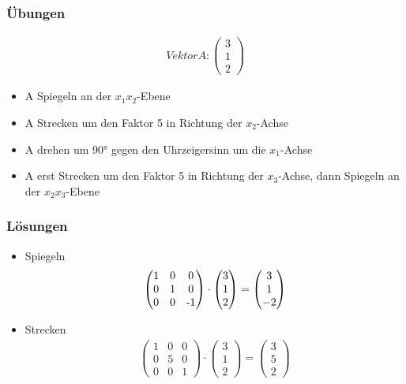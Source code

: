 \begin{frame}
	\frametitle{Übungen}
	\begin{gather*}
	Vektor A: \begin{pmatrix}
		3 \\
		1 \\
		2
	\end{pmatrix}
	\end{gather*}
	\begin{itemize}
		\item A Spiegeln an der $x_{1}x_{2}$-Ebene
		\item A Strecken um den Faktor 5 in Richtung der $x_{2}$-Achse
		\item A drehen um 90° gegen den Uhrzeigersinn um die $x_{1}$-Achse
		\item A erst Strecken um den Faktor 5 in Richtung der $x_{3}$-Achse, dann Spiegeln an der $x_{2}x_{3}$-Ebene
	\end{itemize}
\end{frame}

\begin{frame}
	\frametitle{Lösungen}
	\begin{itemize}
		\item Spiegeln
		\begin{gather*}
		\begin{pmatrix}
			1 & 0 & 0 \\
			0 & 1 & 0 \\
			0 & 0 & $-1$
			\end{pmatrix} \cdot
			\begin{pmatrix}
				3 \\
				1 \\
				2
			\end{pmatrix} = \begin{pmatrix}
				3 \\
				1 \\
				-2
			\end{pmatrix} \end{gather*}
		\item Strecken
		\begin{gather*} \begin{pmatrix}
			1 & 0 & 0 \\
			0 & 5 & 0 \\
			0 & 0 & 1
			\end{pmatrix} \cdot
			\begin{pmatrix}
				3 \\
				1 \\
				2
			\end{pmatrix} = \begin{pmatrix}
				3 \\
				5 \\
				2
			\end{pmatrix} \end{gather*}
	\end{itemize}
\end{frame}

